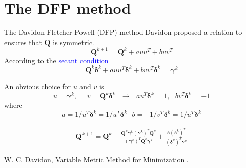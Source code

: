 \documentclass{beamer}
\begin{document}
\section{The DFP method}
\begin{frame}{The Davidon-Fletcher-Powell (DFP) method}
Davidon proposed a relation to ensures that $\boldsymbol{Q}$ is symmetric.
\begin{equation*}
    \boldsymbol{Q}^{k+1} = \boldsymbol{Q}^{k} + a uu^T + bvv^T
\end{equation*}
According to the \textcolor{blue}{secant condition}
\begin{equation*}
    \boldsymbol{Q}^{k} \boldsymbol{\delta}^k + a uu^T\boldsymbol{\delta}^k + bvv^T\boldsymbol{\delta}^k = \boldsymbol{\gamma}^{k} 
\end{equation*}

An obvious choice for $u$ and $v$ is
\begin{equation*}
    u = \boldsymbol{\gamma}^k,~~~~~~ v=\boldsymbol{Q}^k\boldsymbol{\delta}^k ~~~ \rightarrow 
    ~~~ au^T \boldsymbol{\delta}^k = 1, ~~~bv^T\boldsymbol{\delta}^k = -1
\end{equation*}
where 
\begin{equation*}
    a = 1/u^T \boldsymbol{\delta}^k = 1/u^T \boldsymbol{\delta}^k ~~~
    b = -1/v^T \boldsymbol{\delta}^k = 1/u^T \boldsymbol{\delta}^k
\end{equation*}

\begin{gather*}
    \boldsymbol{Q}^{k+1} = \boldsymbol{Q}^k - \frac{ \boldsymbol{Q}^k \boldsymbol{\gamma}^k (\boldsymbol{\gamma}^k)^T \boldsymbol{Q}^k }
    {(\boldsymbol{\gamma}^k)^T \boldsymbol{Q}^k \boldsymbol{\gamma}^k} 
    + \frac{\boldsymbol{\delta}(\boldsymbol{\delta}^k)^T}{(\boldsymbol{\delta}^k)^T \boldsymbol{\gamma}^k}
\end{gather*}

\begin{thebibliography}{10}
\alert{W. C. Davidon, Variable Metric Method for Minimization}
.

\end{thebibliography}

\end{frame}
\end{document}
